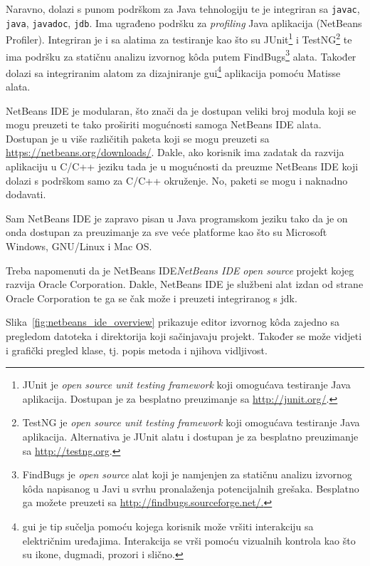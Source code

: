 Naravno, dolazi s punom podrškom za Java tehnologiju te je integriran sa \texttt{javac}, \texttt{java}, \texttt{javadoc}, \texttt{jdb}. Ima ugrađeno podršku za \emph{profiling} Java aplikacija (NetBeans Profiler). Integriran je i sa alatima za testiranje kao što su JUnit\footnote{JUnit je \emph{open source unit testing framework} koji omogućava testiranje Java aplikacija. Dostupan je za besplatno preuzimanje sa \url{http://junit.org/}.} i TestNG\footnote{TestNG je \emph{open source unit testing framework} koji omogućava testiranje Java aplikacija. Alternativa je JUnit alatu i dostupan je za besplatno preuzimanje sa \url{http://testng.org}.} te ima podršku za statičnu analizu izvornog kôda putem FindBugs\footnote{FindBugs je \emph{open source} alat koji je namjenjen za statičnu analizu izvornog kôda napisanog u Javi u svrhu pronalaženja potencijalnih grešaka. Besplatno ga možete preuzeti sa \url{http://findbugs.sourceforge.net/.}} alata. Također dolazi sa integriranim alatom za dizajniranje \gls{gui}\footnote{\gls{gui} je tip sučelja pomoću kojega korisnik može vršiti interakciju sa električnim uređajima. Interakcija se vrši pomoću vizualnih kontrola kao što su ikone, dugmadi, prozori i slično.} aplikacija pomoću Matisse alata.

NetBeans IDE je modularan, što znači da je dostupan veliki broj modula koji se mogu preuzeti te tako proširiti mogućnosti samoga NetBeans IDE alata. Dostupan je u više različitih paketa koji se mogu preuzeti sa \url{https://netbeans.org/downloads/}. Dakle, ako korisnik ima zadatak da razvija aplikaciju u C/C++ jeziku tada je u mogućnosti da preuzme NetBeans IDE koji dolazi s podrškom samo za C/C++ okruženje. No, paketi se mogu i naknadno dodavati.

Sam NetBeans IDE je zapravo pisan u Java programskom jeziku tako da je on onda dostupan za preuzimanje za sve veće platforme kao što su Microsoft Windows, GNU/Linux i Mac OS.

Treba napomenuti da je NetBeans IDE\emph{NetBeans IDE} \emph{open source} projekt kojeg razvija Oracle Corporation. Dakle, NetBeans IDE je službeni alat izdan od strane Oracle Corporation te ga se čak može i preuzeti integriranog s \gls{jdk}.

Slika~\ref{fig:netbeans_ide_overview} prikazuje editor izvornog kôda zajedno sa pregledom datoteka i direktorija koji sačinjavaju projekt. Također se može vidjeti i grafički pregled klase, tj. popis metoda i njihova vidljivost.

